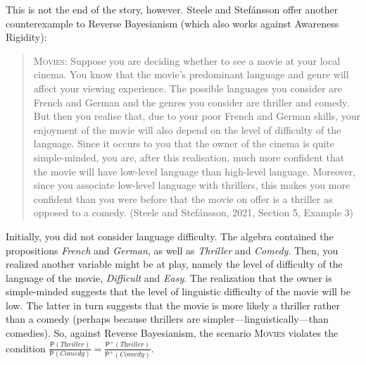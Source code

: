 \documentclass[
  11pt,
  dvipsnames,enabledeprecatedfontcommands]{scrartcl}
\newcommand{\pr}[1]{\ensuremath{\mathsf{P}(#1)}}
\newcommand{\ppr}[2]{\ensuremath{\mathsf{P}^{#1}(#2)}}
\begin{document}
This is not the end of the story, however. Steele and Stefánsson offer
another counterexample to Reverse Bayesianism (which also works against
Awareness Rigidity):

\begin{quote}
\textsc{Movies}: Suppose you are deciding whether to see a movie at your
local cinema. You know that the movie's predominant language and genre
will affect your viewing experience. The possible languages you consider
are French and German and the genres you consider are thriller and
comedy. But then you realise that, due to your poor French and German
skills, your enjoyment of the movie will also depend on the level of
difficulty of the language. Since it occurs to you that the owner of the
cinema is quite simple-minded, you are, after this realisation, much
more confident that the movie will have low-level language than
high-level language. Moreover, since you associate low-level language
with thrillers, this makes you more confident than you were before that
the movie on offer is a thriller as opposed to a comedy. (Steele and
Stefánsson, 2021, Section 5, Example 3)
\end{quote}

\noindent Initially, you did not consider language difficulty. The
algebra contained the propositions \textit{French} and \textit{German},
as well as \textit{Thriller} and \textit{Comedy}. Then, you realized
another variable might be at play, namely the level of difficulty of the
language of the movie, \textit{Difficult} and \textit{Easy}. The
realization that the owner is simple-minded suggests that the level of
linguistic difficulty of the movie will be low. The latter in turn
suggests that the movie is more likely a thriller rather than a comedy
(perhaps because thrillers are simpler---linguistically---than
comedies). So, against Reverse Bayesianism, the scenario \textsc{Movies}
violates the condition
\(\frac{\pr{\textit{Thriller}}}{\pr{\textit{Comedy}}}=\frac{\ppr{+}{\textit{Thriller}}}{\ppr{+}{\textit{Comedy}}}\).
\end{document}
